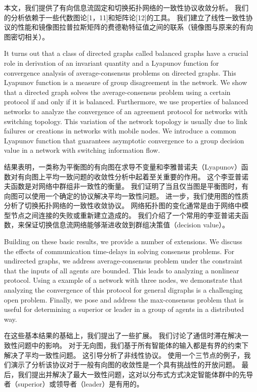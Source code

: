\documentclass{article}
\begin{document}
本文，我们提供了有向信息流固定和切换拓扑网络的一致性协议收敛分析。
我们的分析依赖于一些代数图论[1，11]和矩阵论[12]的工具。
我们建立了线性一致性协议的性能和镜像图拉普拉斯矩阵的费德勒特征值之间的联系（镜像图与原来的有向图密切相关）。

{\color[gray]{0.5}
It turns out that a class of directed graphs called balanced graphs have a crucial role in derivation of an invariant quantity and a Lyapunov function for convergence analysis of average-consensus problems on directed graphs. 
This Lyapunov function is a measure of group disagreement in the network. 
We show that a directed graph solves the average-consensus problem using a certain protocol if and only if it is balanced. 
Furthermore, we use properties of balanced networks to analyze the convergence of an agreement protocol for networks with switching topology. 
This variation of the network topology is usually due to link failures or creations in networks with mobile nodes. 
We introduce a common Lyapunov function that guarantees asymptotic convergence to a group decision value in a network with switching information ﬂow.
}

结果表明，一类称为平衡图的有向图在求导不变量和李雅普诺夫（Lyapunov）函数对有向图上平均一致问题的收敛性分析中起着至关重要的作用。
这个李亚普诺夫函数是对网络中群组非一致性的衡量。
我们证明了当且仅当图是平衡图时，有向图可以使用一个确定的协议解决平均一致性问题。
进一步，我们使用图的性质分析了切换拓扑网络的一致性收敛协议。
网络拓扑图的变化通常是由于网络中模型节点之间连接的失败或重新建立造成的。
我们介绍了一个常用的李亚普诺夫函数，来保证切换信息流网络能够渐进收敛到群组决策值（decision value）。

{\color[gray]{0.5}
Building on these basic results, we provide a number of extensions. 
We discuss the eﬀects of communication time-delays in solving consensus problems. 
For undirected graphs, we address average-consensus problem under the constraint that the inputs of all agents are bounded. 
This leads to analyzing a nonlinear protocol. 
Using a example of a network with three nodes, we demonstrate that analyzing the convergence of this protocol for general digraphs is a challenging open problem. 
Finally, we pose and address the max-consensus problem that is useful for determining a superior or leader in a group of agents in a distributed way.
}

在这些基本结果的基础上，我们提出了一些扩展。
我们讨论了通信时滞在解决一致性问题中的影响。
对于无向图，我们基于所有智能体的输入都是有界的约束下解决了平均一致性问题。
这引导分析了非线性协议。
使用一个三节点的例子，我们演示了分析该协议对于一般有向图的收敛性是一个具有挑战性的开放问题。
最后，我们提出并解决了最大一致性问题，这对以分布式方式决定智能体群中的先导者（superior）或领导者（leader）是有用的。
\end{document}

